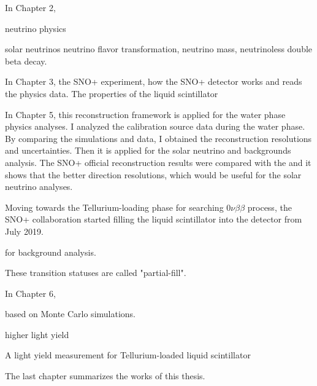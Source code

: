 In Chapter 2, 

neutrino physics

solar neutrinos
neutrino flavor transformation, neutrino mass, neutrinoless double beta decay.

In Chapter 3, the SNO+ experiment, how the SNO+ detector works and reads the physics data.
The properties of the liquid scintillator


In Chapter 5, this reconstruction framework is applied for the water phase physics analyses. I analyzed the calibration source data during the water phase. By comparing the simulations and data, I obtained the reconstruction resolutions and uncertainties. Then it is applied for the solar neutrino and backgrounds analysis.
The SNO+ official reconstruction results were compared with the and it shows that the better direction resolutions, which would be useful for the solar neutrino analyses.





Moving towards the Tellurium-loading phase for searching $0\nu\beta\beta$ process, the SNO+ collaboration started filling the liquid scintillator into the detector from July 2019. 

for background analysis.

These transition statuses are called "partial-fill".  

In Chapter 6, 

based on Monte Carlo simulations.

higher light yield

A light yield measurement for Tellurium-loaded liquid scintillator

The last chapter summarizes the works of this thesis.